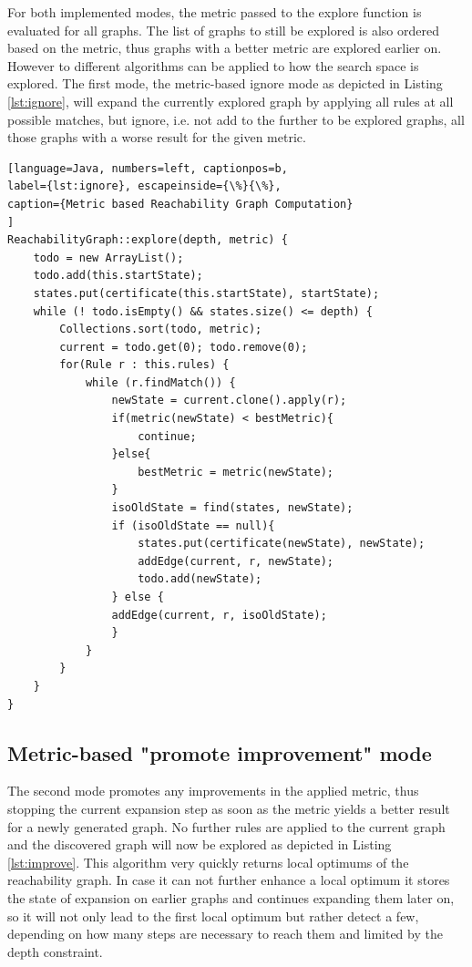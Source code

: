 \documentclass[submission,copyright,creativecommons]{eptcs}
\begin{document}
For both implemented modes, the metric passed to the explore function is 
evaluated for all graphs. The list of graphs to still be explored is also 
ordered based on the metric, thus graphs with a better metric are explored 
earlier on. However to different algorithms can be applied to how the search 
space is explored. The first mode, the metric-based ignore mode as depicted in 
Listing \ref{lst:ignore}, will expand 
the currently explored graph by applying all rules at all possible matches, but 
ignore, i.e. not add to the further to be explored graphs, all those graphs 
with a worse result for the given metric.

\begin{lstlisting}[language=Java, numbers=left, captionpos=b, 
label={lst:ignore}, escapeinside={\%}{\%},
caption={Metric based Reachability Graph Computation}
]
ReachabilityGraph::explore(depth, metric) {
	todo = new ArrayList();
	todo.add(this.startState);
	states.put(certificate(this.startState), startState);
	while (! todo.isEmpty() && states.size() <= depth) {
		Collections.sort(todo, metric);
		current = todo.get(0); todo.remove(0);
		for(Rule r : this.rules) {
			while (r.findMatch()) {
				newState = current.clone().apply(r);
				if(metric(newState) < bestMetric){
					continue;
				}else{
					bestMetric = metric(newState);
				}
				isoOldState = find(states, newState);
				if (isoOldState == null){
					states.put(certificate(newState), newState);
					addEdge(current, r, newState);
					todo.add(newState);
				} else {
				addEdge(current, r, isoOldState);
				}
			}
		}
	}
}

\end{lstlisting}

\subsection{Metric-based "promote improvement" mode}

The second mode promotes any improvements in the applied metric, thus stopping 
the current expansion step as soon as the metric yields a better result for a 
newly generated graph. No further rules are applied to the current graph and 
the discovered graph will now be explored as depicted in Listing 
\ref{lst:improve}. This algorithm very quickly returns 
local optimums of the reachability graph. In case it can not further enhance a 
local optimum it stores the state of expansion on earlier graphs and continues 
expanding them later on, so it will not only lead to the first local optimum 
but rather detect a few, depending on how many steps are necessary to reach 
them and limited by the depth constraint.
\end{document}
